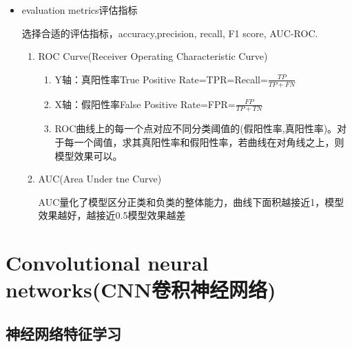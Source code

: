 \documentclass[UTF8]{ctexart}
\begin{document}
\begin{itemize}
\begin{itemize}
    \item evaluation metrics评估指标
    
    选择合适的评估指标，accuracy,precision, recall, F1 score, AUC-ROC.

    \begin{enumerate}
        \item ROC Curve(Receiver Operating Characteristic Curve)
        
        \begin{enumerate}
            \item Y轴：真阳性率True Positive Rate=TPR=Recall=$\frac{TP}{TP+FN}$
            \item X轴：假阳性率False Positive Rate=FPR=$\frac{FP}{TP+TN}$
            \item ROC曲线上的每一个点对应不同分类阈值的(假阳性率,真阳性率)。对于每一个阈值，求其真阳性率和假阳性率，若曲线在对角线之上，则模型效果可以。
        \end{enumerate}

        \item AUC(Area Under tne Curve)
        
        AUC量化了模型区分正类和负类的整体能力，曲线下面积越接近1，模型效果越好，越接近0.5模型效果越差
    \end{enumerate}

\end{itemize}

\end{itemize}

\section{Convolutional neural networks(CNN卷积神经网络)}

\subsection{神经网络特征学习}
\end{document}
